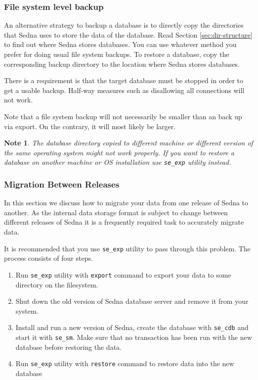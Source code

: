 \documentclass[a4paper,12pt]{article}
\newtheorem{note}{Note}
\begin{document}
\subsubsection{File system level backup}

An alternative strategy to backup a database is to directly copy the directories that Sedna
uses to store the data of the database. Read Section \ref{sec:dir-structure} to find out where
Sedna stores databases. You can use whatever method you prefer for doing usual file system backups.
To restore a database, copy the corresponding backup directory to the location where Sedna stores
databases.

There is a requirement is that the target database must be stopped in order to get a usable backup.
Half-way measures such as disallowing all connections will not work.

Note that a file system backup will not necessarily be smaller than an back up via export. On 
the contrary, it will most likely be larger.

\begin{note}
The database directory copied to different machine or different version of the same operating system 
might not work properly. If you want to restore a database on another machine or OS installation use
\verb!se_exp! utility instead.
\end{note}


\subsubsection{Migration Between Releases}

In this section we discuss how to migrate your data from one release of Sedna to another. 
As the internal data storage format is subject to change between different releases of Sedna it is a 
frequently required task to accurately migrate data.  

It is recommended that you use \verb!se_exp! utility to pass through this problem. The process 
consists of four steps.

\begin{enumerate}
\item
Run \verb!se_exp! utility with \verb!export! command to export your data to some 
directory on the filesystem.
\item
Shut down the old version of Sedna database server and remove it from your system. 
\item
Install and run a new version of Sedna, create the database with \verb!se_cdb! and start it with 
\verb!se_sm!. Make sure that no transaction has been run with the new database before restoring 
the data.
\item
Run \verb!se_exp! utility with \verb!restore! command to restore data into the new database
\end{enumerate}
\end{document}
